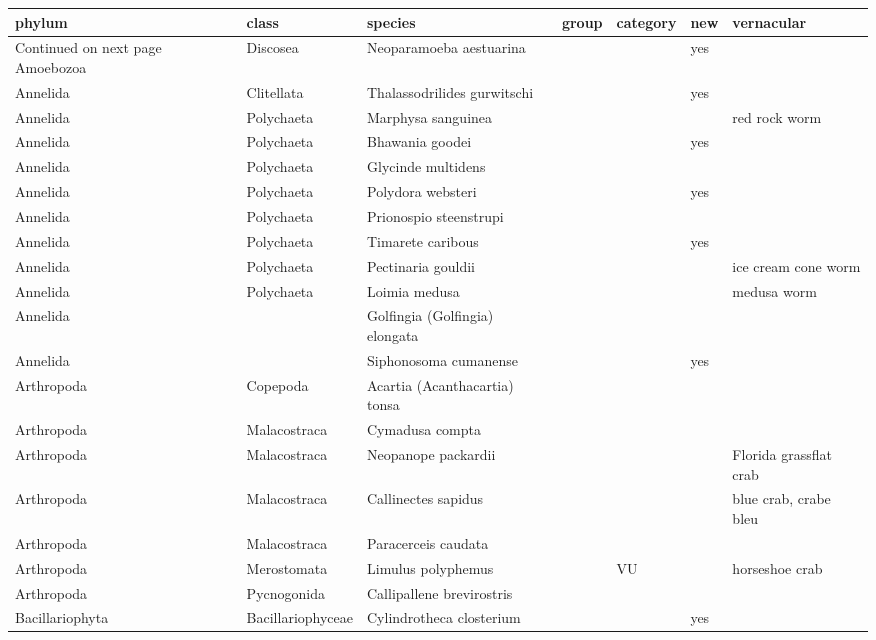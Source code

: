 \begingroup\fontsize{9pt}{10pt}\selectfont
\begin{longtable}{lllllll}
  \hline
phylum & class & species & group & category & new & vernacular \\ 
  \hline 
\endhead 
\hline 
{\footnotesize Continued on next page} 
\endfoot 
\endlastfoot 
Amoebozoa & Discosea & Neoparamoeba aestuarina &  &  & yes &  \\ 
  Annelida & Clitellata & Thalassodrilides gurwitschi &  &  & yes &  \\ 
  Annelida & Polychaeta & Marphysa sanguinea &  &  &  & red rock worm \\ 
  Annelida & Polychaeta & Bhawania goodei &  &  & yes &  \\ 
  Annelida & Polychaeta & Glycinde multidens &  &  &  &  \\ 
  Annelida & Polychaeta & Polydora websteri &  &  & yes &  \\ 
  Annelida & Polychaeta & Prionospio steenstrupi &  &  &  &  \\ 
  Annelida & Polychaeta & Timarete caribous &  &  & yes &  \\ 
  Annelida & Polychaeta & Pectinaria gouldii &  &  &  & ice cream cone worm \\ 
  Annelida & Polychaeta & Loimia medusa &  &  &  & medusa worm \\ 
  Annelida &  & Golfingia (Golfingia) elongata &  &  &  &  \\ 
  Annelida &  & Siphonosoma cumanense &  &  & yes &  \\ 
  Arthropoda & Copepoda & Acartia (Acanthacartia) tonsa &  &  &  &  \\ 
  Arthropoda & Malacostraca & Cymadusa compta &  &  &  &  \\ 
  Arthropoda & Malacostraca & Neopanope packardii &  &  &  & Florida grassflat crab \\ 
  Arthropoda & Malacostraca & Callinectes sapidus &  &  &  & blue crab, crabe bleu \\ 
  Arthropoda & Malacostraca & Paracerceis caudata &  &  &  &  \\ 
  Arthropoda & Merostomata & Limulus polyphemus &  & VU &  & horseshoe crab \\ 
  Arthropoda & Pycnogonida & Callipallene brevirostris &  &  &  &  \\ 
  Bacillariophyta & Bacillariophyceae & Cylindrotheca closterium &  &  & yes &  \\ 

\end{longtable}
